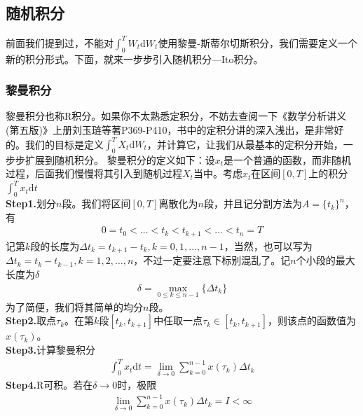     \subsection{随机积分}
        \label{subsec:随机积分}
        \par
        前面我们提到过，不能对$\int_0^T W_t \mathrm{d}W_t$使用黎曼-斯蒂尔切斯积分，我们需要定义一个新的积分形式。下面，就来一步步引入随机积分—Ito积分。
        \subsubsection{黎曼积分}
            \label{subsubsec:黎曼积分}
            \par
            黎曼积分也称R积分。如果你不太熟悉定积分，不妨去查阅一下《数学分析讲义(第五版)》上册刘玉琏等著P369-P410，书中的定积分讲的深入浅出，是非常好的。我们的目标是定义$\int_0^T X_t \mathrm{d}W_t$，并计算它，让我们从最基本的定积分开始，一步步扩展到随机积分。
            黎曼积分的定义如下：设$x_t$是一个普通的函数，而非随机过程，后面我们慢慢将其引入到随机过程$X_t$当中。考虑$x_t$在区间$[0,T]$上的积分$\int_0^T x_t \mathrm{d}t$\\
            \textbf{Step1.}划分$n$段。我们将区间$[0,T]$离散化为$n$段，并且记分割方法为$A = \{t_k\}^n$，有
            \begin{align*}
                0 = t_0 <\dots <t_k<t_{k+1}<\dots<t_n = T
            \end{align*}
            记第$k$段的长度为$\Delta t_k = t_{k+1}-t_k,k = 0,1,\dots,n - 1$，当然，也可以写为$\Delta t_k = t_{k}-t_{k-1},k = 1,2,\dots,n$，不过一定要注意下标别混乱了。记$n$个小段的最大长度为$\delta$
            \begin{align*}
                \delta = \max_{0 \leqslant k \leqslant n-1}\{\Delta t_k\}
            \end{align*}
            为了简便，我们将其简单的均分$n$段。\\
            \textbf{Step2.}取点$\tau_k$。在第$k$段$[t_{k},t_{k+1}]$中任取一点$\tau_k\in [t_{k},t_{k+1}]$，则该点的函数值为$x(\tau_k)$。\\
            \textbf{Step3.}计算黎曼积分
            \begin{align*}
                \int_0^T x_t\mathrm{d}t = \lim_{\delta \rightarrow 0} \sum_{k = 0}^{n-1} x(\tau_k)\Delta t_k
            \end{align*}
            \textbf{Step4.}R可积。若在$\delta\rightarrow 0$时，极限
            \begin{align*}
                \lim_{\delta \rightarrow 0} \sum_{k = 0}^{n-1} x(\tau_k)\Delta t_k = I<\infty
            \end{align*}
